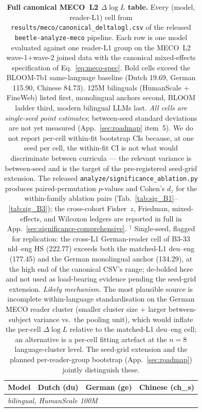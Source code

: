 \begin{table}[!ht]
  \centering
  \scriptsize
  \setlength{\tabcolsep}{4pt}
  \caption{\textbf{Full canonical MECO~L2 $\Delta\log L$ table.} Every (model, reader-L1) cell from \texttt{results/meco/canonical\_deltalogl.csv} of the released \texttt{beetle-analyze-meco} pipeline. Each row is one model evaluated against one reader-L1 group on the MECO~L2 wave-1$+$wave-2 joined data with the canonical mixed-effects specification of Eq.~\ref{eq:meco-spec}. Bold cells exceed the BLOOM-7b1 same-language baseline (Dutch 19.69, German 115.90, Chinese 84.73). \beetle{} 125M bilinguals (HumanScale $+$ FineWeb) listed first, monolingual anchors second, BLOOM ladder third, modern bilingual LLMs last. \emph{All cells are single-seed point estimates}; between-seed standard deviations are not yet measured (App.~\ref{sec:roadmap} item~5). We do not report per-cell within-fit bootstrap CIs because, at one seed per cell, the within-fit CI is not what would discriminate between curricula --- the relevant variance is between-seed and is the target of the pre-registered seed-grid extension. The released \texttt{analyze/significance\_ablation.py} produces paired-permutation $p$-values and Cohen's $d_z$ for the within-family ablation pairs (Tab.~\ref{tab:sig_B1}--\ref{tab:sig_B3}); the cross-cohort Fisher~$z$, Friedman, mixed-effects, and Wilcoxon ledgers are reported in full in App.~\ref{sec:significance-comprehensive}. $^{\dagger}$ Single-seed, flagged for replication: the cross-L1 German-reader cell of B3-33 nld--eng HS (222.77) exceeds both the matched-L1 deu--eng \beetle{} (177.45) and the German monolingual anchor (134.29), at the high end of the canonical CSV's range; de-bolded here and not used as load-bearing evidence pending the seed-grid extension. \emph{Likely mechanism.} The most plausible source is incomplete within-language standardisation on the German MECO reader cluster (smaller cluster size + larger between-subject variance vs.\ the pooling unit), which would inflate the per-cell $\Delta\log L$ relative to the matched-L1 deu--eng cell; an alternative is a per-cell fitting artefact at the $n=8$ language-cluster level. The seed-grid extension and the planned per-reader-group bootstrap (App.~\ref{sec:roadmap}) jointly distinguish these.}
  \label{tab:meco_full_canonical}
  \begin{tabular}{lrrr}
    \toprule
    Model & Dutch (du) & German (ge) & Chinese (ch\_s) \\
    \midrule
    \multicolumn{4}{l}{\textit{\beetle{} bilingual, HumanScale 100M}} \\

\end{tabular}
\end{table}
